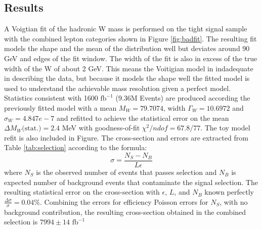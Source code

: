 \subsection{Results}
\label{subsec:wmass}

A Voigtian fit of the hadronic W mass is performed on the tight signal sample with the combined lepton categories shown in Figure \ref{fig:badfit}. The resulting fit models the shape and the mean of the distribution well but deviates around 90 GeV and edges of the fit window. The width of the fit is also in excess of the true width of the W of about 2 GeV. This means the Voitigian model in indadequate in describing  the data, but because it models the shape well the fitted model is used to understand the achievable mass resolution given a perfect model. Statistics consistent with 1600 $\text{fb}^{-1}$ (9.36M Events) are produced according the previously fitted model with a mean  $M_W = 79.7074$, width $\Gamma_W = 10.6972$ and $\sigma_W = 4.847e-7$ and refitted to achieve the statistical error on the mean $\Delta M_W \text{(stat.)} = 2.4$ MeV with goodness-of-fit $\chi^2 / ndof = 67.8/77$. The toy model refit is also included in Figure.
The cross-section and errors are extracted from Table \ref{tab:selection} according to the formula:
\begin{equation}
\sigma = \frac{N_S - N_B}{L \epsilon}
\end{equation}
where $N_S$ is the observed number of events that passes selection and $N_B$ is expected number of background events that contaminate the signal selection. The resulting statistical error on the cross-section with $\epsilon$, $L$, and $N_B$ known perfectly $\frac{\Delta \sigma}{\sigma} = 0.04 \%$. Combining the errors for efficiency Poisson errors for $N_S$, with no background contribution, the resulting cross-section obtained in the combined selection is $7994 \pm 14 \, \, \text{fb}^{-1}$
